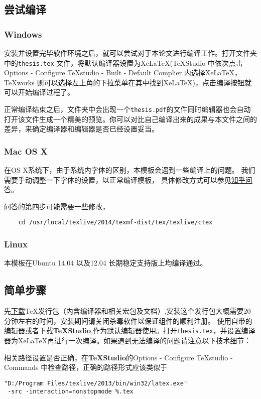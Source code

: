 \subsection{尝试编译}
\subsubsection{Windows}
安装并设置完毕软件环境之后，就可以尝试对于本论文进行编译工作。打开文件夹中的\verb|thesis.tex| 文件，将默认编译器设置为Xe\LaTeX(\TeX Studio 中依次点击Options - Configure TeXstudio - Built - Default Complier 内选择Xe\LaTeX ，\TeX works 则可以选择左上角的下拉菜单在其中找到Xe\LaTeX )，点击编译按钮就可以开始编译过程了。

正常编译结束之后，文件夹中会出现一个\verb|thesis.pdf|的文件同时编辑器也会自动打开该文件生成一个精美的预览。你可以对比自己编译出来的成果与本文件之间的差异，来确定编译器和编辑器是否已经设置妥当。
\subsubsection{Mac OS X}

在OS X系统下，由于系统内字体的区别，本模板会遇到一些编译上的问题。 我们需要手动调整一下字体的设置，以正常编译模板， 具体修改方式可以参见\href{http://www.zhihu.com/question/22906637}{知乎问答}。 

问答的第四步可能需要一些修改，
\begin{verbatim}
	cd /usr/local/texlive/2014/texmf-dist/tex/texlive/ctex
\end{verbatim}

\subsubsection{Linux}
本模板在Ubuntu 14.04 以及12.04 长期稳定支持版上均编译通过。

\subsection{简单步骤}
先\href{https://www.tug.org/texlive/acquire-iso.html}{下载}\TeX 发行包（内含编译器和相关宏包及文档）,安装这个发行包大概需要20分钟左右的时间，安装期间请关闭杀毒软件以保证组件的顺利注册。
使用自带的编辑器或者下载\href{http://texstudio.sourceforge.net/}{\textbf{\TeX Studio}},作为默认编辑器使用。打开\verb|thesis.tex|，并设置编译器为Xe\LaTeX 再进行一次编译。如果遇到无法编译的问题请注意以下技术细节：

相关路径设置是否正确，在\textbf{\TeX Studio}的Options - Configure TeXstudio - Commands 中检查路径，正确的路径\cite{谢琪-203}形式应该类似于

\begin{verbatim}
"D:/Program Files/texlive/2013/bin/win32/latex.exe"
 -src -interaction=nonstopmode %.tex
\end{verbatim}

























